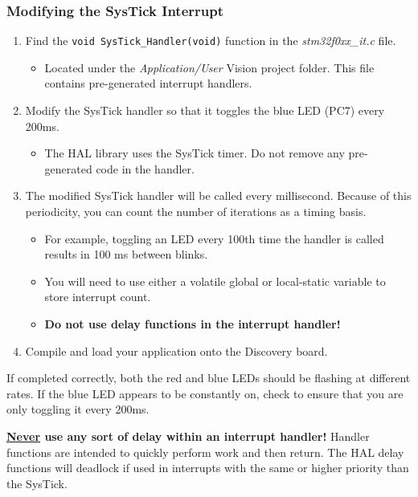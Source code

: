 \documentclass[11pt,fleqn]{book} %
\begin{document}
\begin{exercise}
    \subsubsection{Modifying the SysTick Interrupt}
    \begin{enumerate}
        \item Find the \texttt{void SysTick\_Handler(void)} function in the \textit{stm32f0xx\_it.c} file. 
        \begin{itemize}
            \item Located under the \textit{Application/User} {\textmu}Vision project folder. This file contains pre-generated interrupt handlers. 
        \end{itemize}
        \item Modify the SysTick handler so that it toggles the blue LED (PC7) every 200ms. 
        \begin{itemize}
            \item The HAL library uses the SysTick timer. Do not remove any pre-generated code in the handler.
        \end{itemize}
        \item The modified SysTick handler will be called every millisecond. Because of this periodicity, you can count the number of iterations as a timing basis.
        \begin{itemize}
            \item For example, toggling an LED every 100th time the handler is called results in 100 ms between blinks.
            \item You will need to use either a volatile global or local-static variable to store interrupt count.
            \item \textbf{Do not use delay functions in the interrupt handler!}
        \end{itemize}
    \item Compile and load your application onto the Discovery board.
    \end{enumerate}

     If completed correctly, both the red and blue LEDs should be flashing at different rates. If the blue LED appears to be constantly on, check to ensure that you are only toggling it every 200ms.
\end{exercise}

\begin{warning}
    \textbf{\underline{Never} use any sort of delay within an interrupt handler!} Handler functions are intended to quickly perform work and then return. The HAL delay functions will deadlock if used in interrupts with the same or higher priority than the SysTick.
\end{warning}
\end{document}
